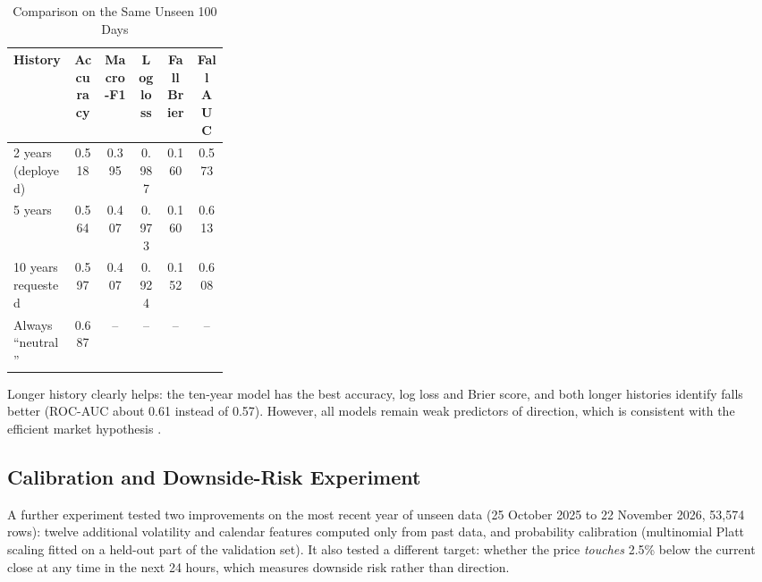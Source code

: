 {\renewcommand{\arraystretch}{1.3}
\begin{longtable}{|p{0.28\linewidth}|c|c|c|c|c|}
\caption{Comparison on the Same Unseen 100 Days}\label{tab:ml-history}\\\hline
\textbf{History} & \textbf{Accuracy} & \textbf{Macro-F1} & \textbf{Log loss} & \textbf{Fall Brier} & \textbf{Fall AUC}\\\hline
2 years (deployed) & 0.518 & 0.395 & 0.987 & 0.160 & 0.573\\\hline
5 years & 0.564 & 0.407 & 0.973 & 0.160 & 0.613\\\hline
10 years requested & 0.597 & 0.407 & 0.924 & 0.152 & 0.608\\\hline
Always ``neutral'' & 0.687 & -- & -- & -- & --\\\hline
\end{longtable}}

Longer history clearly helps: the ten-year model has the best accuracy, log loss and Brier score, and both longer histories identify falls better (ROC-AUC about 0.61 instead of 0.57). However, all models remain weak predictors of direction, which is consistent with the efficient market hypothesis \cite{fama1970}.

\subsection{Calibration and Downside-Risk Experiment}
A further experiment tested two improvements on the most recent year of unseen data (25 October 2025 to 22 November 2026, 53{,}574 rows): twelve additional volatility and calendar features computed only from past data, and probability calibration (multinomial Platt scaling fitted on a held-out part of the validation set). It also tested a different target: whether the price \textit{touches} 2.5\% below the current close at any time in the next 24 hours, which measures downside risk rather than direction.

